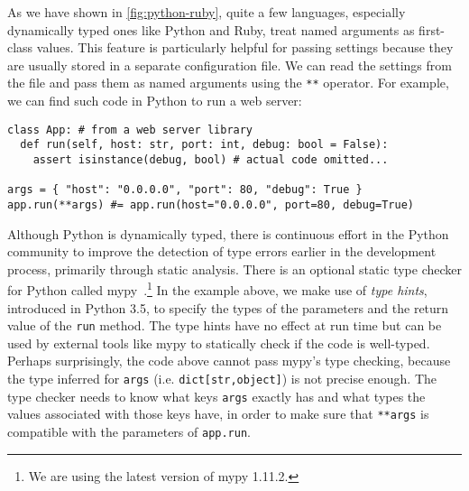 As we have shown in \autoref{fig:python-ruby}, quite a few languages, especially
dynamically typed ones like Python and Ruby, treat named arguments as
first-class values. This feature is particularly helpful for passing settings
because they are usually stored in a separate configuration file. We can read
the settings from the file and pass them as named arguments using the
\lstinline{**} operator. For example, we can find such code in Python to run a
web server:
\begin{lstlisting}[language={[3]Python}]
class App: # from a web server library
  def run(self, host: str, port: int, debug: bool = False):
    assert isinstance(debug, bool) # actual code omitted...

args = { "host": "0.0.0.0", "port": 80, "debug": True }
app.run(**args) #= app.run(host="0.0.0.0", port=80, debug=True)
\end{lstlisting}
Although Python is dynamically typed, there is continuous effort in the Python
community to improve the detection of type errors earlier in the development
process, primarily through static analysis. There is an optional static type
checker for Python called mypy~\citep{mypy}.\footnote{We are using the latest
version of mypy 1.11.2.} In the example above, we make use of \emph{type hints},
introduced in Python 3.5, to specify the types of the parameters and the return
value of the \lstinline{run} method. The type hints have no effect at run time
but can be used by external tools like mypy to statically check if the code is
well-typed. Perhaps surprisingly, the code above cannot pass mypy's type
checking, because the type inferred for \lstinline{args} (i.e.
\lstinline{dict[str,object]}) is not precise enough. The type checker needs to
know what keys \lstinline{args} exactly has and what types the values associated
with those keys have, in order to make sure that \lstinline{**args} is
compatible with the parameters of \lstinline{app.run}.

